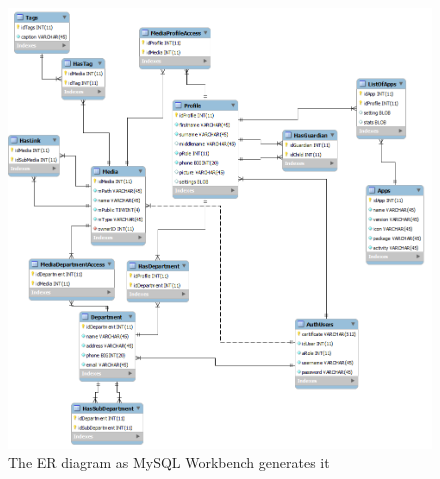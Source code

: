 \begin{figure}[H]
	\centering
		\includegraphics[width=1.00\textwidth]{images/workbenchWrong.png}
	\caption{The ER diagram as MySQL Workbench generates it}
	\label{fig:workbenchWrong}
\end{figure}
